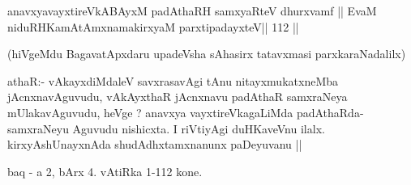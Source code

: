 \begin{shl}
anavxyavayxtireVkABAyxM padAthaRH samxyaRteV dhurxvamf ||
EvaM niduRHKamAtAmxnamakirxyaM parxtipadayxteV\hfill || 112 ||
\end{shl}

\begin{artha}
(hiVgeMdu BagavatApxdaru upadeVsha sAhasirx tatavxmasi
  parxkaraNadalilx) 
\end{artha}

\begin{artha}
athaR:- vAkayxdiMdaleV savxrasavAgi tAnu nitayxmukatxneMba
jAcnxnavAguvudu, vAkAyxthaR jAcnxnavu padAthaR samxraNeya
mUlakavAguvudu, heVge ? anavxya vayxtireVkagaLiMda
padAthaRda-samxraNeyu Aguvudu nishicxta. I riVtiyAgi duHKaveVnu ilalx.
kirxyAshUnayxnAda shudAdhxtamxnanunx paDeyuvanu ||
\end{artha}


\begin{center}
baq - a 2, bArx 4. vAtiRka 1-112 kone.
\end{center}

